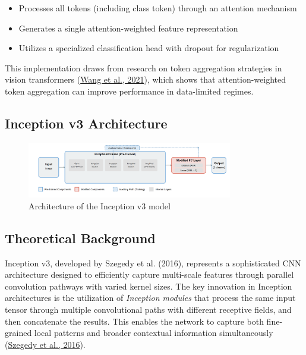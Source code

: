 \documentclass[a4paper,12pt]{report}
\begin{document}
\begin{itemize}
    \item Processes all tokens (including class token) through an attention mechanism
    \item Generates a single attention-weighted feature representation
    \item Utilizes a specialized classification head with dropout for regularization
\end{itemize}

This implementation draws from research on token aggregation strategies in vision transformers (\href{https://arxiv.org/abs/2012.09688}{Wang et al., 2021}), which shows that attention-weighted token aggregation can improve performance in data-limited regimes.

\subsection{Inception v3 Architecture}

\begin{figure}[h]
    \centering
    \includegraphics[width=0.8\textwidth]{images/architecture/inception.png}
    \caption{Architecture of the Inception v3 model}
    \label{fig:inception_architecture}
\end{figure}

\subsection*{Theoretical Background}

Inception v3, developed by Szegedy et al. (2016), represents a sophisticated CNN architecture designed to efficiently capture multi-scale features through parallel convolution pathways with varied kernel sizes. The key innovation in Inception architectures is the utilization of \textit{Inception modules} that process the same input tensor through multiple convolutional paths with different receptive fields, and then concatenate the results. This enables the network to capture both fine-grained local patterns and broader contextual information simultaneously (\href{https://arxiv.org/abs/1512.00567}{Szegedy et al., 2016}).
\end{document}
